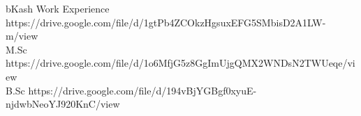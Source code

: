 
\horizontalLineLeft

\certificateItem
    {bKash Work Experience}
    {https://drive.google.com/file/d/1gtPb4ZCOkzHgsuxEFG5SMbisD2A1LW-m/view} \\
\certificateItem
    {M.Sc}
    {https://drive.google.com/file/d/1o6MfjG5z8GgImUjgQMX2WNDsN2TWUeqe/view} \\
\certificateItem
    {B.Sc}
    {https://drive.google.com/file/d/194vBjYGBgf0xyuE-njdwbNeoYJ920KnC/view}

